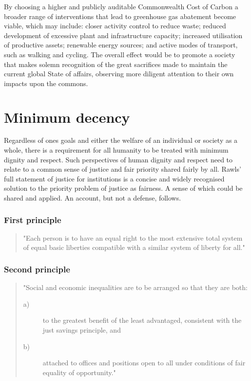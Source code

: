 \documentclass[11pt, oneside]{book}   	%
\begin{document}
By choosing a higher and publicly auditable Commonwealth Cost of Carbon a broader range of interventions that lead to greenhouse gas abatement become viable, which may include: closer activity control to reduce waste; reduced development of excessive plant and infrastructure capacity; increased utilisation of productive assets; renewable energy sources; and active modes of transport, such as walking and cycling.
The overall effect would be to promote a society that makes solemn recognition of the great sacrifices made to maintain the current global State of affairs, observing more diligent attention to their own impacts upon the commons.\

\section{Minimum decency}
Regardless of ones goals and either the welfare of an individual or society as a whole, there is a requirement for all humanity to be treated with minimum dignity and respect.
Such perspectives of human dignity and respect need to relate to a common sense of justice and fair priority shared fairly by all.
Rawls'~\cite{jr1} full statement of justice for institutions is a concise and widely recognised solution to the priority problem of justice as fairness.
A sense of which could be shared and applied.
An account, but not a defense, follows.

\subsubsection{First principle}

\begin{quote}
"Each person is to have an equal right to the most extensive total system of equal basic liberties compatible with a similar system of liberty for all."
\end{quote}

\subsubsection{Second principle}

\begin{quote}
"Social and economic inequalities are to be arranged so that they are both:
\begin{description}
\item[ a)] to the greatest benefit of the least advantaged, consistent with the just savings principle, and
\item[ b)] attached to offices and positions open to all under conditions of fair equality of opportunity."
\end{description}
\end{quote}
\end{document}
